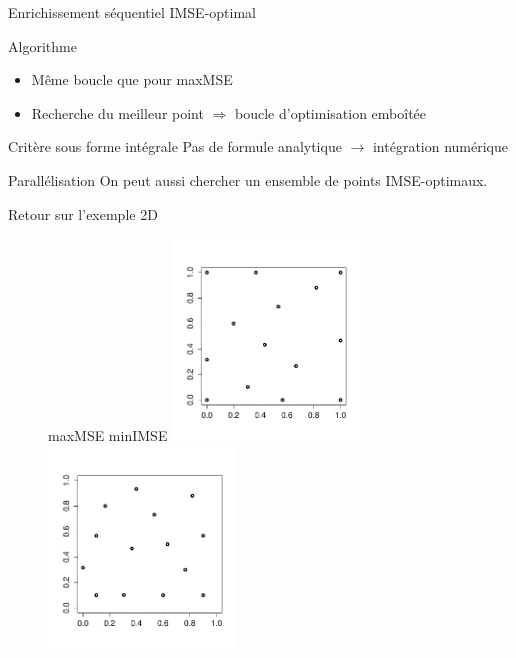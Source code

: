 \begin{frame}{Enrichissement séquentiel IMSE-optimal}
\begin{block}{Algorithme}
\begin{itemize}
 \item Même boucle que pour maxMSE
 \item Recherche du meilleur point $\Rightarrow$ boucle d'optimisation emboîtée
\end{itemize}
\end{block}

\begin{alertblock}{Critère sous forme intégrale}
Pas de formule analytique $\rightarrow$ intégration numérique
\end{alertblock}

\begin{exampleblock}{Parallélisation}
 On peut aussi chercher un ensemble de points IMSE-optimaux.
\end{exampleblock}

\end{frame}
\begin{frame}{Retour sur l'exemple 2D}
\begin{figure}
	\centering
	\hspace{5mm}maxMSE \hspace{35mm} minIMSE
	\includegraphics[trim=0mm 17mm 0mm 10mm,width=50mm, clip]{mse/maxMSE14.pdf}
	\includegraphics[trim=0mm 17mm 0mm 10mm,width=50mm, clip]{mse/minIMSE14.pdf}
\end{figure}
\end{frame}
